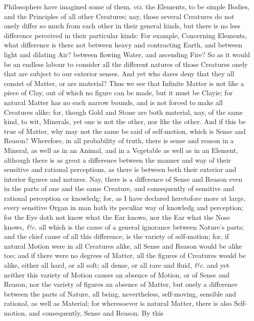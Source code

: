 Philosophers have imagined some of them, \textit{viz}. the Elements,
to be simple Bodies, and the Principles of all other Creatures; nay,
those several Creatures do not onely differ so much from each other in
their general kinds, but there is no less difference perceived in
their particular kinds: For example, Concerning Elements, what
difference is there not between heavy and contracting Earth, and
between light and dilating Air? between flowing Water, and ascending
Fire? So as it would be an endless labour to consider all the
different natures of those Creatures onely that are subject to our
exterior senses. And yet who dares deny that they all consist of
Matter, or are material? Thus we see that Infinite Matter is not like
a piece of Clay, out of which no figure can be made, but it must be
Clayie; for natural Matter has no such narrow bounds, and is not
forced to make all Creatures alike; for, though Gold and Stone are
both material, nay, of the same kind, to wit, Minerals, yet one is not
the other, nor like the other. And if this be true of Matter, why may
not the same be said of self-motion, which is Sense and Reason?
Wherefore, in all probability of truth, there is sense and reason in a
Mineral, as well as in an  Animal, and in a Vegetable as
well as in an Element, although there is as great a difference between
the manner and way of their sensitive and rational perceptions, as
there is between both their exterior and interior figures and natures.
Nay, there is a difference of Sense and Reason even in the parts of
one and the same Creature, and consequently of sensitive and rational
perception or knowledg; for, as I have declared heretofore more at
large, every sensitive Organ in man hath its peculiar way of knowledg
and perception; for the Eye doth not know what the Ear knows, nor the
Ear what the Nose knows, \textit{\&c}. all which is the cause of a
general ignorance between Nature's parts; and the chief cause of all
this difference, is the variety of self-motion; for, if natural Motion
were in all Creatures alike, all Sense and Reason would be alike too;
and if there were no degrees of Matter, all the figures of Creatures
would be alike, either all hard, or all soft; all dense, or all rare
and fluid, \textit{\&c}. and yet neither this variety of Motion causes
an absence of Motion, or of Sense and Reason, nor the variety of
figures an absence of Matter, but onely a difference between the parts
of Nature, all being, nevertheless, self-moving, sensible and
rational, as well as Material; for wheresoever is natural Matter,
there is also Self-motion, and consequently, Sense and Reason. By this
